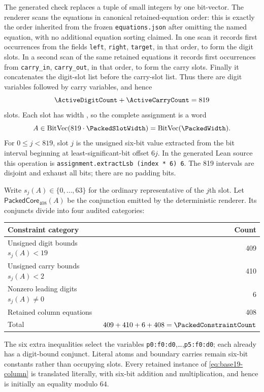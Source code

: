 \documentclass[11pt,twoside]{article}
\theoremstyle{remark}
\begin{document}
The generated check replaces a tuple of small integers by one bit-vector.
The renderer scans the equations in canonical retained-equation order: this
is exactly the order inherited from the frozen \texttt{equations.json} after
omitting the named equation, with no additional equation sorting claimed.
In one scan it records first occurrences from the fields \texttt{left},
\texttt{right}, \texttt{target}, in that order, to form the digit slots.  In a
second scan of the same retained equations it records first occurrences from
\nolinkurl{carry_in}, \nolinkurl{carry_out}, in that order, to form the carry
slots.  Finally it concatenates the digit-slot list before the carry-slot
list.  Thus there are \ActiveDigitCount{} digit variables followed by
\ActiveCarryCount{} carry variables, and hence
\[
  \ActiveDigitCount+\ActiveCarryCount=819
\]
slots.  Each slot has width \PackedSlotWidth{}, so the complete assignment is
a word
\[
  A\in\operatorname{BitVec}(819\cdot\PackedSlotWidth)
    =\operatorname{BitVec}(\PackedWidth).
\]
For $0\leq j<819$, slot $j$ is the unsigned six-bit value extracted from
the bit interval beginning at least-significant-bit offset $6j$.  In the
generated Lean source this operation is
\texttt{assignment.extractLsb\textquotesingle{} (index * 6) 6}.  The 819 intervals are
disjoint and exhaust all \PackedWidth{} bits; there are no padding bits.

Write $s_j(A)\in\{0,\ldots,63\}$ for the ordinary representative of the
$j$th slot.  Let $\mathsf{PackedCore}_{408}(A)$ be the conjunction emitted by
the deterministic renderer.  Its \PackedConstraintCount{} conjuncts divide
into four audited categories:
\begin{center}
  \begin{tabular}{@{}lr@{}}
    \toprule
    Constraint category & Count \\
    \midrule
    Unsigned digit bounds $s_j(A)<19$ & 409 \\
    Unsigned carry bounds $s_j(A)<2$ & 410 \\
    Nonzero leading digits $s_j(A)\neq0$ & 6 \\
    Retained column equations & 408 \\
    \midrule
    Total & $409+410+6+408=\PackedConstraintCount$ \\
    \bottomrule
  \end{tabular}
\end{center}
The six extra inequalities select the variables
\texttt{p0:f0:d0},\ldots,\texttt{p5:f0:d0}; each already has a digit-bound
conjunct.  Literal atoms and boundary carries remain six-bit constants rather
than occupying slots.  Every retained instance of
\cref{eq:base19-column} is translated literally, with six-bit addition and
multiplication, and hence is initially an equality modulo $64$.
\end{document}
